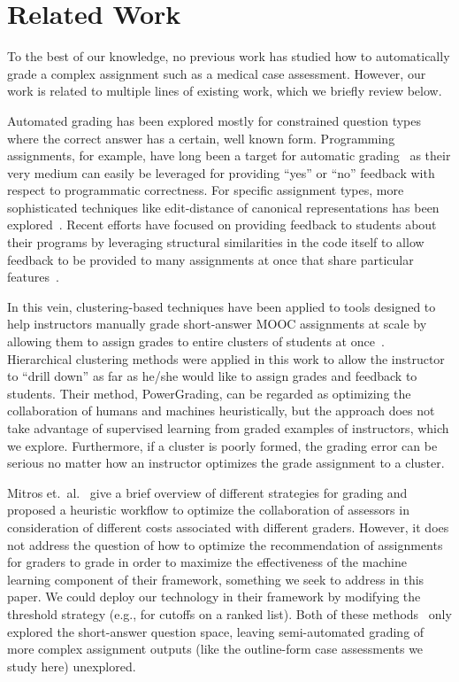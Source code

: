 \section{Related Work}

To the best of our knowledge, no previous work has studied how to automatically grade
a complex assignment such as a medical case assessment. However, our work
is related to multiple lines of existing work, which we briefly review below. 

Automated grading has been explored mostly for constrained question
types where the correct answer has a certain, well known form. Programming
assignments, for example, have long been a target for automatic
grading~\cite{Forsythe:1965:CACM, Helmick:2007:ITICSE} as their very medium
can easily be leveraged for providing ``yes'' or ``no'' feedback with
respect to programmatic correctness. For specific assignment types, more
sophisticated techniques like edit-distance of canonical representations
has been explored~\cite{Alur:2013:IJCAI}. Recent efforts have focused on
providing feedback to students about their programs by leveraging
structural similarities in the code itself to allow feedback to be provided
to many assignments at once that share particular
features~\cite{Nguyen:2014:WWW, Piech:2015:ICML}.

In this vein, clustering-based techniques have been applied to tools
designed to help instructors manually grade short-answer MOOC assignments
at scale by allowing them to assign grades to entire clusters of students
at once~\cite{Brooks:2014:Powergrading}. Hierarchical clustering methods
were applied in this work to allow the instructor to ``drill down'' as far
as he/she would like to assign grades and feedback to students. Their
method, PowerGrading, can be regarded as optimizing the collaboration of
humans and machines heuristically, but the approach does not take advantage
of supervised learning from graded examples of instructors, which we
explore. Furthermore, if a cluster is poorly formed, the grading error can
be serious no matter how an instructor optimizes the grade assignment to a
cluster.

Mitros et.\ al.~\cite{Mitros:2013:MITLINC} give a brief overview of
different strategies for grading and proposed a heuristic workflow to
optimize the collaboration of assessors in consideration of different costs
associated with different graders. However, it does not address the
question of how to optimize the recommendation of assignments for graders
to grade in order to maximize the effectiveness of the machine learning
component of their framework, something we seek to address in this paper.
We could deploy our technology in their framework by modifying the
threshold strategy (e.g., for cutoffs on a ranked list). Both of these
methods~\cite{Brooks:2014:Powergrading, Mitros:2013:MITLINC} only explored
the short-answer question space, leaving semi-automated grading of more
complex assignment outputs (like the outline-form case assessments we study
here) unexplored.

